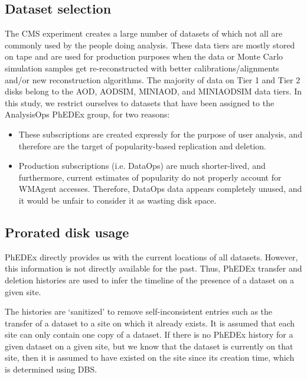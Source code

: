\subsection{Dataset selection}

The CMS experiment creates a large number of datasets of which not all are
commonly used by the people doing analysis. These data tiers are mostly
stored on tape and are used for production purposes when the data or Monte Carlo
simulation samples get re-reconstructed with better calibrations/alignments
and/or new reconstruction algorithms. The majority of data on Tier 1 and Tier 2 
disks belong to the AOD, AODSIM, MINIAOD, and MINIAODSIM data tiers. In this study,
we restrict ourselves to datasets that have been assigned to the AnalysisOps 
PhEDEx group, for two reasons:
\begin{itemize}
  \item These subscriptions are created expressly for the purpose of user analysis,
    and therefore are the target of popularity-based replication and deletion.
  \item Production subscriptions (i.e. DataOps) are much shorter-lived, and furthermore,
    current estimates of popularity do not properly account for WMAgent accesses.
    Therefore, DataOps data appears completely unused, and it would be unfair to
    consider it as wasting disk space.
\end{itemize}

\subsection{Prorated disk usage}

PhEDEx directly provides us with the current locations of all datasets. However,
this information is not directly available for the past. Thus, PhEDEx transfer
and deletion histories are used to infer the timeline of the presence of a
dataset on a given site.

The histories are `sanitized' to remove self-inconsistent entries such as the
transfer of a dataset to a site on which it already exists. It is assumed that
each site can only contain one copy of a dataset. If there is no PhEDEx history
for a given dataset on a given site, but we know that the dataset is currently
on that site, then it is assumed to have existed on the site since its creation
time, which is determined using DBS.

